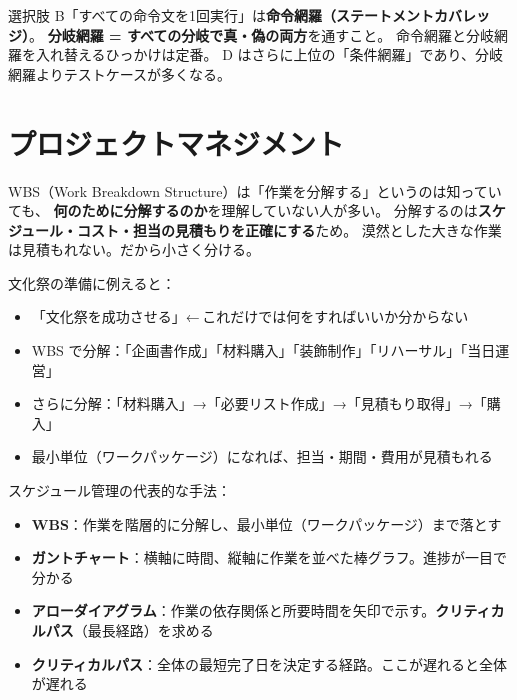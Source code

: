 \begin{trickwarn}
選択肢 B「すべての命令文を1回実行」は\textbf{命令網羅（ステートメントカバレッジ）}。
\textbf{分岐網羅 = すべての分岐で真・偽の両方}を通すこと。
命令網羅と分岐網羅を入れ替えるひっかけは定番。
D はさらに上位の「条件網羅」であり、分岐網羅よりテストケースが多くなる。
\end{trickwarn}




\section{プロジェクトマネジメント}

\mondaipage
{}

\begin{stumble}
WBS（Work Breakdown Structure）は「作業を分解する」というのは知っていても、
\textbf{何のために分解するのか}を理解していない人が多い。
分解するのは\textbf{スケジュール・コスト・担当の見積もりを正確にする}ため。
漠然とした大きな作業は見積もれない。だから小さく分ける。
\end{stumble}

\begin{analogy}
文化祭の準備に例えると：
\begin{itemize}
  \item 「文化祭を成功させる」←\,これだけでは何をすればいいか分からない
  \item WBS で分解：「企画書作成」「材料購入」「装飾制作」「リハーサル」「当日運営」
  \item さらに分解：「材料購入」→「必要リスト作成」→「見積もり取得」→「購入」
  \item 最小単位（ワークパッケージ）になれば、担当・期間・費用が見積もれる
\end{itemize}
\end{analogy}

\begin{keypoint}
スケジュール管理の代表的な手法：
\begin{itemize}
  \item \textbf{WBS}：作業を階層的に分解し、最小単位（ワークパッケージ）まで落とす
  \item \textbf{ガントチャート}：横軸に時間、縦軸に作業を並べた棒グラフ。進捗が一目で分かる
  \item \textbf{アローダイアグラム}：作業の依存関係と所要時間を矢印で示す。\textbf{クリティカルパス}（最長経路）を求める
  \item \textbf{クリティカルパス}：全体の最短完了日を決定する経路。ここが遅れると全体が遅れる
\end{itemize}
\end{keypoint}

